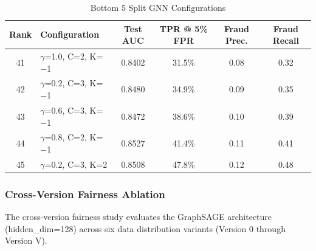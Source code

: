 \begin{table}[H]
\centering
\tablestrut
\caption{Bottom 5 Split GNN Configurations}
\label{tab:gnn-bottom5}
\small
\begin{tabularx}{\textwidth}{cXcccc}
\toprule
\textbf{Rank} & \textbf{Configuration} & \textbf{Test AUC} & \textbf{TPR @ 5\% FPR} & \textbf{Fraud Prec.} & \textbf{Fraud Recall} \\
\midrule
41 & $\gamma$=1.0, C=2, K=$-$1 & 0.8402 & 31.5\% & 0.08 & 0.32 \\
42 & $\gamma$=0.2, C=3, K=$-$1 & 0.8480 & 34.9\% & 0.09 & 0.35 \\
43 & $\gamma$=0.6, C=3, K=$-$1 & 0.8472 & 38.6\% & 0.10 & 0.39 \\
44 & $\gamma$=0.8, C=2, K=$-$1 & 0.8527 & 41.4\% & 0.11 & 0.41 \\
45 & $\gamma$=0.2, C=3, K=2    & 0.8508 & 47.8\% & 0.12 & 0.48 \\
\bottomrule
\end{tabularx}
\end{table}

\subsubsection{Cross-Version Fairness Ablation}

The cross-version fairness study evaluates the GraphSAGE architecture (hidden\_dim=128) across six data distribution variants (Version 0 through Version V).

\begin{table}[H]
\centering
\tablestrut
\caption{Experiment Configuration and Dataset Characteristics Across All Six Data Versions}
\label{tab:gnn-version-configs}
\footnotesize
{}
\end{table}

